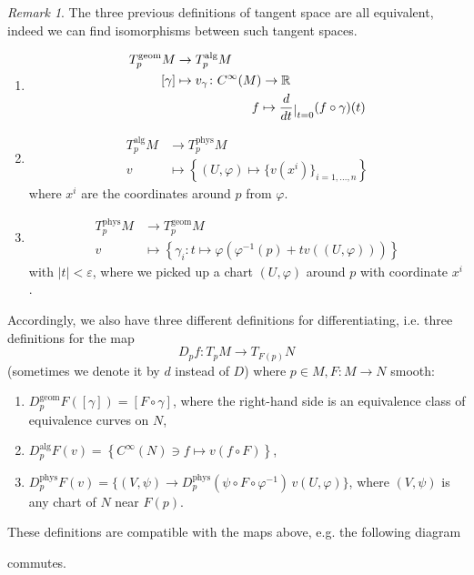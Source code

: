 \documentclass[a4paper,11pt,titlepage, article, oneside]{memoir}
\numberwithin{equation}{section}
\theoremstyle{definition}
\theoremstyle{remark}
\newtheorem{remark}[theorem]{Remark}
\newcommand{\rfield}{\mathbb{R}}
\newcommand{\restrict}[2]{{#1}\raisebox{-.5ex}{$|$}_{#2}}
\newcommand{\diondi}[1]{\frac{d}{d{#1}}}
\newcommand{\tangentgeom}[1]{T_{#1}^{\text{geom}}}
\newcommand{\tangentphys}[1]{T_{#1}^{\text{phys}}}
\newcommand{\tangentalg}[1]{T_{#1}^{\text{alg}}}
\begin{document}
\begin{remarkbox}\begin{remark} \label{equivremark}
The three previous definitions of tangent space are all equivalent, indeed we can find isomorphisms between such tangent spaces.
\begin{enumerate}
\item
\begin{align}
\tangentgeom{p}M &\rightarrow \tangentalg{p}M  \\
[\gamma] &\mapsto v_{\gamma}\colon C^{\infty}(M) \rightarrow \rfield \\
& \qquad \qquad \qquad f \mapsto \restrict{\diondi{t}}{t=0} (f\circ \gamma)(t)
\end{align}
\item 
\begin{align}
\tangentalg{p}M &\rightarrow \tangentphys{p}M  \\
v &\mapsto \left \{ (U, \varphi) \mapsto\{v(x^i)\}_{i=1, \ldots, n} \right \}
\end{align}
where $x^i$ are the coordinates around $p$ from $\varphi$.
\item 
\begin{align}
\tangentphys{p}M &\rightarrow \tangentgeom{p}M  \\
v &\mapsto \left\{ \gamma_i \colon t \mapsto \varphi(\varphi^{-1}(p) + tv((U, \varphi)))\right\}
\end{align}
with $|t| < \varepsilon$, where we picked up a chart $(U, \varphi)$ around $p$ with coordinate $x^i$.
\end{enumerate}
Accordingly, we also have three different definitions for differentiating, i.e. three definitions for the map
\begin{equation}
D_p f \colon T_pM \rightarrow T_{F(p)} N
\end{equation}
(sometimes we denote it by $d$ instead of $D$) where $p \in M, F \colon M \rightarrow N$ smooth:
\begin{enumerate}
\item $D_p^{\text{geom}} F ([\gamma]) = [F \circ \gamma]$, where the right-hand side is an equivalence class of equivalence curves on $N$,
\item $D_p^{\text{alg}} F (v) = \left \{C^{\infty}(N) \ni f \mapsto v(f \circ F) \right \}$,
\item $D_p^{\text{phys}} F(v) = \{ (V, \psi) \rightarrow D_p^{\text{phys}} (\psi \circ F \circ \varphi^{-1})\, v(U, \varphi)\}$, where $(V, \psi)$ is any chart of $N$ near $F(p)$.
\end{enumerate}
These definitions are compatible with the maps above, e.g. the following diagram
\begin{center}
\end{center}
commutes.
\end{remark}\end{remarkbox}
\end{document}
